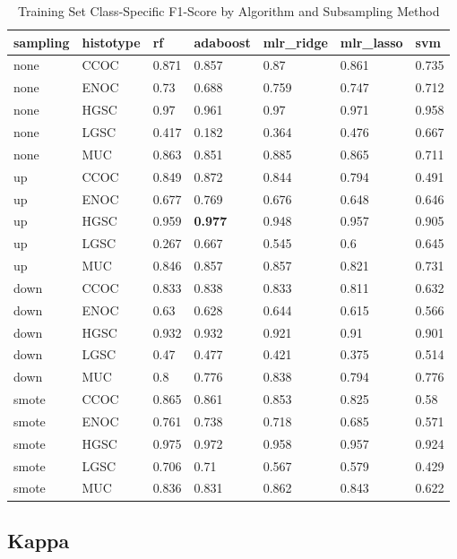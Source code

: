 \documentclass[
]{report}
\begin{document}
\begin{table}

\caption{\label{tab:train-f1-class-table}Training Set Class-Specific F1-Score by Algorithm and Subsampling Method}
\centering
\begin{tabular}[t]{l|l|l|l|l|l|l}
\hline
sampling & histotype & rf & adaboost & mlr\_ridge & mlr\_lasso & svm\\
\hline
none & CCOC & 0.871 & 0.857 & 0.87 & 0.861 & 0.735\\
\hline
none & ENOC & 0.73 & 0.688 & 0.759 & 0.747 & 0.712\\
\hline
none & HGSC & 0.97 & 0.961 & 0.97 & 0.971 & 0.958\\
\hline
none & LGSC & 0.417 & 0.182 & 0.364 & 0.476 & 0.667\\
\hline
none & MUC & 0.863 & 0.851 & 0.885 & 0.865 & 0.711\\
\hline
up & CCOC & 0.849 & 0.872 & 0.844 & 0.794 & 0.491\\
\hline
up & ENOC & 0.677 & 0.769 & 0.676 & 0.648 & 0.646\\
\hline
up & HGSC & 0.959 & \textbf{0.977} & 0.948 & 0.957 & 0.905\\
\hline
up & LGSC & 0.267 & 0.667 & 0.545 & 0.6 & 0.645\\
\hline
up & MUC & 0.846 & 0.857 & 0.857 & 0.821 & 0.731\\
\hline
down & CCOC & 0.833 & 0.838 & 0.833 & 0.811 & 0.632\\
\hline
down & ENOC & 0.63 & 0.628 & 0.644 & 0.615 & 0.566\\
\hline
down & HGSC & 0.932 & 0.932 & 0.921 & 0.91 & 0.901\\
\hline
down & LGSC & 0.47 & 0.477 & 0.421 & 0.375 & 0.514\\
\hline
down & MUC & 0.8 & 0.776 & 0.838 & 0.794 & 0.776\\
\hline
smote & CCOC & 0.865 & 0.861 & 0.853 & 0.825 & 0.58\\
\hline
smote & ENOC & 0.761 & 0.738 & 0.718 & 0.685 & 0.571\\
\hline
smote & HGSC & 0.975 & 0.972 & 0.958 & 0.957 & 0.924\\
\hline
smote & LGSC & 0.706 & 0.71 & 0.567 & 0.579 & 0.429\\
\hline
smote & MUC & 0.836 & 0.831 & 0.862 & 0.843 & 0.622\\
\hline
\end{tabular}
\end{table}

\hypertarget{kappa}{%
\subsection{Kappa}\label{kappa}}
\end{document}
